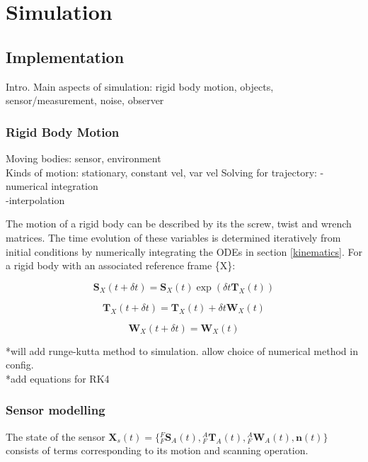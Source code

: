 \chapter{Simulation}
\section{Implementation}
Intro. Main aspects of simulation: rigid body motion, objects, sensor/measurement, noise, observer

\subsection{Rigid Body Motion}
Moving bodies: sensor, environment\\
Kinds of motion: stationary, constant vel, var vel
Solving for trajectory:
	-numerical integration\\
	-interpolation
	
The motion of a rigid body can be described by its the screw, twist and wrench matrices. The time evolution of these variables is determined iteratively from initial conditions by numerically integrating the ODEs in section \ref{kinematics}. For a rigid body with an associated reference frame \{X\}:

\begin{equation}
	\mathbf{S}_X(t+\delta t) = \mathbf{S}_X(t)\exp({\delta t {\mathbf{T}_X(t)}})
\end{equation}

\begin{equation}
	\mathbf{T}_X(t+\delta t) = \mathbf{T}_X(t) + \delta t \mathbf{W}_X(t)
\end{equation}

\begin{equation}
	\mathbf{W}_X(t+\delta t) =\mathbf{W}_X(t)
\end{equation}

*will add runge-kutta method to simulation. allow choice of numerical method in config.\\
*add equations for RK4 

\subsection{Sensor modelling}
The state of the sensor 
$\mathbf{X}_{s}(t) = 
	\{{^{F}_{F}\mathbf{S}^{}_{A}(t)},{^{A}_{F}\mathbf{T}^{}_{A}(t)},{^{A}_{F}\mathbf{W}^{}_{A}(t)},
	\mathbf{n}(t)\}$
consists of terms corresponding to its motion and scanning operation. 

